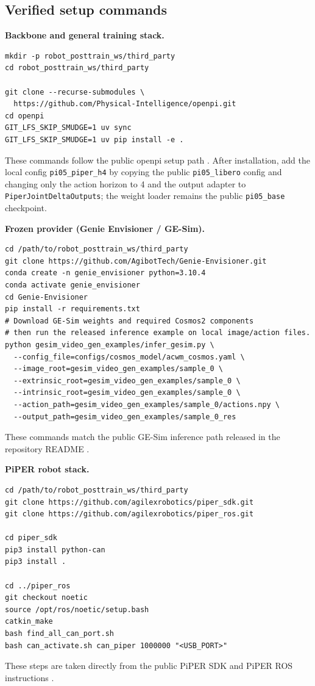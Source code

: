 \documentclass[10pt]{article}
\theoremstyle{plain}
\theoremstyle{definition}
\theoremstyle{remark}
\begin{document}
\subsection{Verified setup commands}
\textbf{Backbone and general training stack.}
\begin{lstlisting}
mkdir -p robot_posttrain_ws/third_party
cd robot_posttrain_ws/third_party

git clone --recurse-submodules \
  https://github.com/Physical-Intelligence/openpi.git
cd openpi
GIT_LFS_SKIP_SMUDGE=1 uv sync
GIT_LFS_SKIP_SMUDGE=1 uv pip install -e .
\end{lstlisting}
These commands follow the public openpi setup path \citep{openpi2026repo}. After installation, add the local config \texttt{pi05\_piper\_h4} by copying the public \texttt{pi05\_libero} config and changing only the action horizon to 4 and the output adapter to \texttt{PiperJointDeltaOutputs}; the weight loader remains the public \texttt{pi05\_base} checkpoint.

\textbf{Frozen provider (Genie Envisioner / GE-Sim).}
\begin{lstlisting}
cd /path/to/robot_posttrain_ws/third_party
git clone https://github.com/AgibotTech/Genie-Envisioner.git
conda create -n genie_envisioner python=3.10.4
conda activate genie_envisioner
cd Genie-Envisioner
pip install -r requirements.txt
# Download GE-Sim weights and required Cosmos2 components
# then run the released inference example on local image/action files.
python gesim_video_gen_examples/infer_gesim.py \
  --config_file=configs/cosmos_model/acwm_cosmos.yaml \
  --image_root=gesim_video_gen_examples/sample_0 \
  --extrinsic_root=gesim_video_gen_examples/sample_0 \
  --intrinsic_root=gesim_video_gen_examples/sample_0 \
  --action_path=gesim_video_gen_examples/sample_0/actions.npy \
  --output_path=gesim_video_gen_examples/sample_0_res
\end{lstlisting}
These commands match the public GE-Sim inference path released in the repository README \citep{genierepo2026}.

\textbf{PiPER robot stack.}
\begin{lstlisting}
cd /path/to/robot_posttrain_ws/third_party
git clone https://github.com/agilexrobotics/piper_sdk.git
git clone https://github.com/agilexrobotics/piper_ros.git

cd piper_sdk
pip3 install python-can
pip3 install .

cd ../piper_ros
git checkout noetic
source /opt/ros/noetic/setup.bash
catkin_make
bash find_all_can_port.sh
bash can_activate.sh can_piper 1000000 "<USB_PORT>"
\end{lstlisting}
These steps are taken directly from the public PiPER SDK and PiPER ROS instructions \citep{agilex2026pipersdk,agilex2026piperros}.
\end{document}
